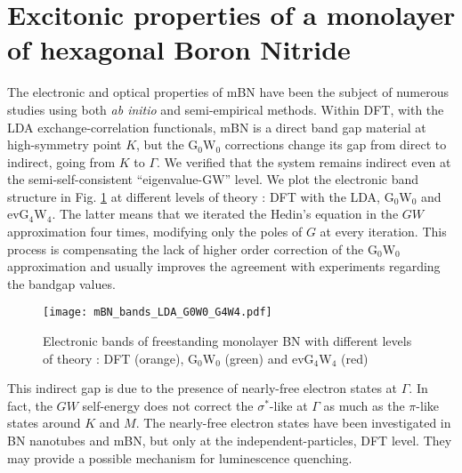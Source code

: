 \section{Excitonic properties of a monolayer of hexagonal Boron Nitride}
The electronic and optical properties of \acrlong{mBN} have been the subject of numerous studies using both \emph{ab initio} and semi-empirical methods.\cite{galvani2016excitons}
Within DFT, with the LDA exchange-correlation functionals, \acrshort{mBN} is a direct band gap material at high-symmetry point $K$, but the G$_0$W$_0$ corrections change its gap from direct to indirect, going from $K$ to $\Gamma$.\cite{prete2020giant} 
We verified that the system remains indirect even at the semi-self-consistent ``eigenvalue-GW'' level. We plot the electronic band structure in Fig. \ref{fig:mBN_bands_LDA_G0W0_G4W4} at different levels of theory : \acrshort{DFT} with the \acrshort{LDA}, G$_0$W$_0$ and evG$_4$W$_4$. The latter means that we iterated the Hedin's equation in the $GW$ approximation four times, modifying only the poles of $G$ at every iteration.\cite{van2006quasiparticle} This process is compensating the lack of higher order correction of the G$_0$W$_0$ approximation and usually improves the agreement with experiments regarding the bandgap values.
\begin{figure}[h!b]
	\vspace{0.2cm}
	\setcapindent{2em}
	\centering
	\texttt{[image: mBN\_bands\_LDA\_G0W0\_G4W4.pdf]}
	\caption{Electronic bands of freestanding monolayer BN with different levels of theory : DFT (orange), G$_ 0$W$_0$ (green) and evG$_4$W$_4$ (red)} %
	\label{fig:mBN_bands_LDA_G0W0_G4W4}
\end{figure}
This indirect gap is due to the presence of nearly-free electron states at $\Gamma$. 
In fact, the $GW$ self-energy does not correct the $\sigma^*$-like at $\Gamma$ as much as the $\pi$-like states around $K$ and $M$.
The nearly-free electron states have been investigated in BN nanotubes and mBN,\cite{blase1994stability,Blase1995monolayer} but only at the independent-particles, \acrshort{DFT} level. They may provide a possible mechanism for luminescence quenching.

